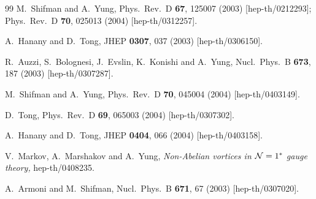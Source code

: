 \begin{thebibliography} {99}
M.~Shifman and A.~Yung,
Phys.\ Rev.\ D {\bf 67}, 125007 (2003)
[hep-th/0212293];
Phys.\ Rev.\ D {\bf 70}, 025013 (2004)
[hep-th/0312257].

A.~Hanany and D.~Tong,
JHEP {\bf 0307}, 037 (2003)
[hep-th/0306150].

R.~Auzzi, S.~Bolognesi, J.~Evslin, K.~Konishi and A.~Yung,
Nucl.\ Phys.\ B {\bf 673}, 187 (2003)
[hep-th/0307287].

M.~Shifman and A.~Yung,
Phys.\ Rev.\ D {\bf 70}, 045004 (2004)
[hep-th/0403149].

D.~Tong,
Phys.\ Rev.\ D {\bf 69}, 065003 (2004)
[hep-th/0307302].

A.~Hanany and D.~Tong,
JHEP {\bf 0404}, 066 (2004)
[hep-th/0403158].

V.~Markov, A.~Marshakov and A.~Yung,
{\em Non-Abelian vortices in ${\cal N} = 1^*$ gauge theory,}
hep-th/0408235.

A.~Armoni and M.~Shifman,
Nucl.\ Phys.\ B {\bf 671}, 67 (2003)
[hep-th/0307020].


\end{thebibliography}
